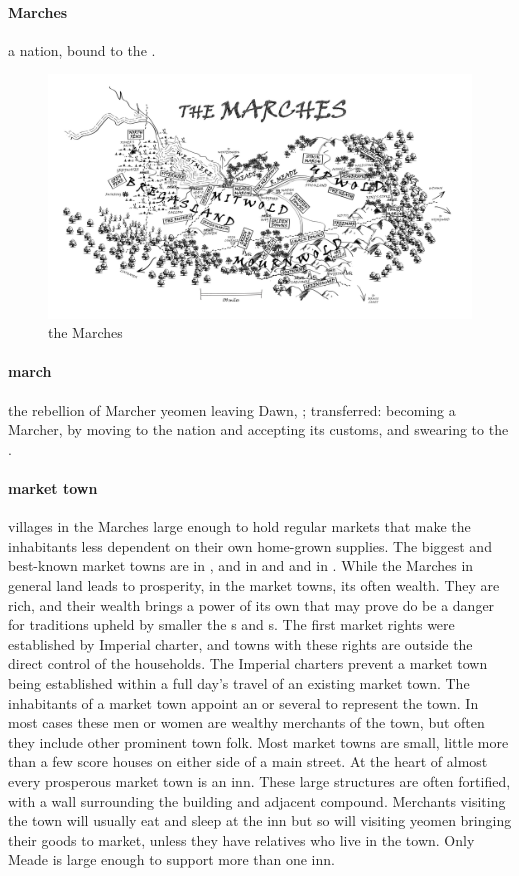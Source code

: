 \paragraph{Marches} a nation, bound to the  . \begin{figure}\centering\includegraphics[width=1.1\textwidth]{encyclopedia/marches}\caption{the Marches}\end{figure}
\paragraph{march} the rebellion of Marcher yeomen leaving Dawn, ; transferred: becoming a Marcher, by moving to the nation and accepting its customs, and swearing to the .
\paragraph{market town} villages in the Marches large enough to hold regular markets that make the inhabitants less dependent on their own home-grown supplies. The biggest and best-known market towns are  in ,  and  in  and  and  in . While the Marches in general land leads to prosperity, in the market towns, its often wealth. They are rich, and their wealth brings a power of its own that may prove do be a danger for traditions upheld by smaller the s and s. \localpar The first market rights were established by Imperial charter, and towns with these rights are outside the direct control of the households. The Imperial charters prevent a market town being established within a full day's travel of an existing market town. The inhabitants of a market town appoint an  or several to represent the town. In most cases these men or women are wealthy merchants of the town, but often they include other prominent town folk. \localpar Most market towns are small, little more than a few score houses on either side of a main street. At the heart of almost every prosperous market town is an inn. These large structures are often fortified, with a wall surrounding the building and adjacent compound. Merchants visiting the town will usually eat and sleep at the inn but so will visiting yeomen bringing their goods to market, unless they have relatives who live in the town. Only Meade is large enough to support more than one inn. 
